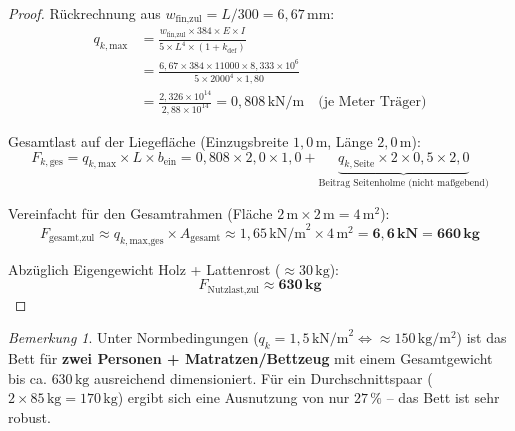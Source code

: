 ﻿\documentclass[12pt,a4paper]{article}
\theoremstyle{definition}
\theoremstyle{plain}
\theoremstyle{remark}
\newtheorem{bemerkung}{Bemerkung}
\begin{document}
\begin{proof}
Rückrechnung aus $w_{\text{fin,zul}} = L/300 = 6{,}67\,\text{mm}$:
\begin{align*}
  q_{k,\text{max}} &= \frac{w_{\text{fin,zul}} \times 384 \times E \times I}
                         {5 \times L^4 \times (1+k_{\text{def}})} \\
                   &= \frac{6{,}67 \times 384 \times 11000 \times 8{,}333\times10^6}
                           {5 \times 2000^4 \times 1{,}80} \\
                   &= \frac{2{,}326 \times 10^{14}}{2{,}88 \times 10^{14}}
                    = 0{,}808\,\text{kN/m} \quad \text{(je Meter Träger)}
\end{align*}

Gesamtlast auf der Liegefläche (Einzugsbreite $1{,}0\,\text{m}$, Länge $2{,}0\,\text{m}$):
\begin{equation*}
  F_{k,\text{ges}} = q_{k,\text{max}} \times L \times b_{\text{ein}}
                   = 0{,}808 \times 2{,}0 \times 1{,}0
                   + \underbrace{q_{k,\text{Seite}} \times 2 \times 0{,}5 \times 2{,}0}
                     _{\text{Beitrag Seitenholme (nicht maßgebend)}}
\end{equation*}

Vereinfacht für den Gesamtrahmen (Fläche $2\,\text{m} \times 2\,\text{m} = 4\,\text{m}^2$):
\begin{equation}
  \boxed{F_{\text{gesamt,zul}} \approx q_{k,\text{max,ges}} \times A_{\text{gesamt}}
  \approx 1{,}65\,\text{kN/m}^2 \times 4\,\text{m}^2 = \mathbf{6{,}6\,\text{kN} = 660\,\text{kg}}}
\end{equation}

Abzüglich Eigengewicht Holz + Lattenrost ($\approx 30\,\text{kg}$):
\begin{equation}
  \boxed{F_{\text{Nutzlast,zul}} \approx \mathbf{630\,\text{kg}}}
\end{equation}
\end{proof}

\begin{bemerkung}
  Unter Normbedingungen ($q_k = 1{,}5\,\text{kN/m}^2 \Leftrightarrow \approx 150\,\text{kg}/\text{m}^2$)
  ist das Bett für \textbf{zwei Personen + Matratzen/Bettzeug} mit einem
  Gesamtgewicht bis ca. $630\,\text{kg}$ ausreichend dimensioniert. Für ein
  Durchschnittspaar ($2 \times 85\,\text{kg} = 170\,\text{kg}$) ergibt sich eine
  Ausnutzung von nur $27\,\%$ -- das Bett ist sehr robust.
\end{bemerkung}
\end{document}
